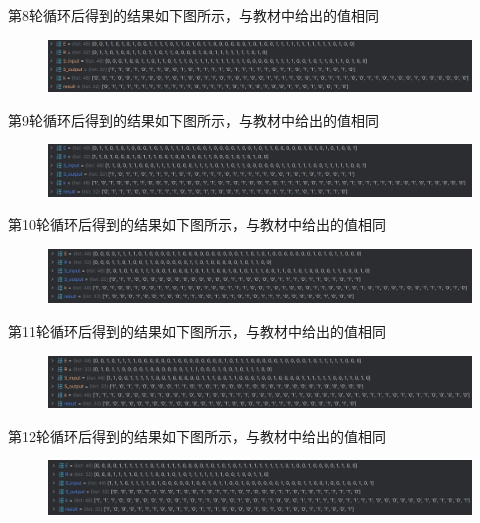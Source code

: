\documentclass[a4paper,11pt,UTF8]{ctexart}
\newcommand{\bottomcaption}{%
\setlength{\abovecaptionskip}{6pt}%
\setlength{\belowcaptionskip}{6pt}%
\caption}
\newcommand{\xiaowuhao}{\fontsize{9pt}{\baselineskip}\selectfont}   %
\begin{document}
            第8轮循环后得到的结果如下图所示，与教材中给出的值相同
            \begin{figure}[H]
                \centering
                \includegraphics[width=15cm]{dN8.png}
                \bottomcaption{\xiaowuhao{第8轮循环的结果}}
            \end{figure}
            第9轮循环后得到的结果如下图所示，与教材中给出的值相同
            \begin{figure}[H]
                \centering
                \includegraphics[width=15cm]{dN9.png}
                \bottomcaption{\xiaowuhao{第9轮循环的结果}}
            \end{figure}
            第10轮循环后得到的结果如下图所示，与教材中给出的值相同
            \begin{figure}[H]
                \centering
                \includegraphics[width=15cm]{dN10.png}
                \bottomcaption{\xiaowuhao{第10轮循环的结果}}
            \end{figure}
            第11轮循环后得到的结果如下图所示，与教材中给出的值相同
            \begin{figure}[H]
                \centering
                \includegraphics[width=15cm]{dN11.png}
                \bottomcaption{\xiaowuhao{第11轮循环的结果}}
            \end{figure}
\newpage
            第12轮循环后得到的结果如下图所示，与教材中给出的值相同
            \begin{figure}[H]
                \centering
                \includegraphics[width=15cm]{dN12.png}
                \bottomcaption{\xiaowuhao{第12轮循环的结果}}
            \end{figure}
\end{document}
